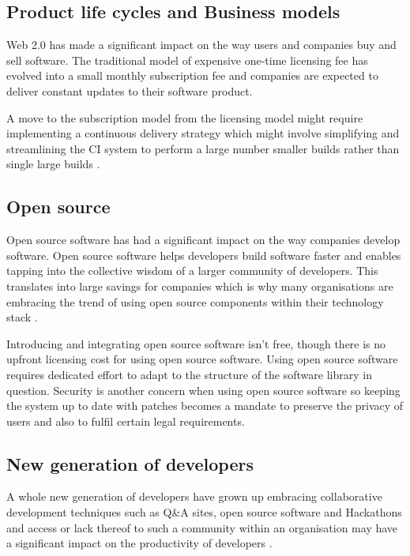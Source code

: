 \documentclass[12pt,conference]{IEEEtran}
\begin{document}
\subsection*{Product life cycles and Business models}

Web 2.0 has made a significant impact on the way users and companies buy and sell software. The traditional model of expensive one-time licensing fee has evolved into a small monthly subscription fee and companies are expected to deliver constant updates to their software product. 

A move to the subscription model from the licensing model might require implementing a continuous delivery strategy which might involve simplifying and streamlining the CI system to perform a large number smaller builds rather than single large builds \cite{schief_transforming_2012} \cite{di_valentin_measuring_2012}.


\subsection*{Open source}

Open source software has had a significant impact on the way companies develop software. Open source software helps developers build software faster and enables tapping into the collective wisdom of a larger community of developers. This translates into large savings for companies which is why many organisations are embracing the trend of using open source components within their technology stack \cite{baldwin_4_2014} \cite{lemmens_open_2008}.

Introducing and integrating open source software isn't free, though there is no upfront licensing cost for using open source software. Using open source software requires dedicated effort to adapt to the structure of the software library in question. Security is another concern when using open source software so keeping the system up to date with patches becomes a mandate to preserve the privacy of users and also to fulfil certain legal requirements.

\subsection*{New generation of developers}

A whole new generation of developers have grown up embracing collaborative development techniques such as Q\&A sites, open source software and Hackathons and access or lack thereof to such a community within an organisation may have a significant impact on the productivity of developers \cite{vasilescu_continuous_2014}. 
\end{document}
